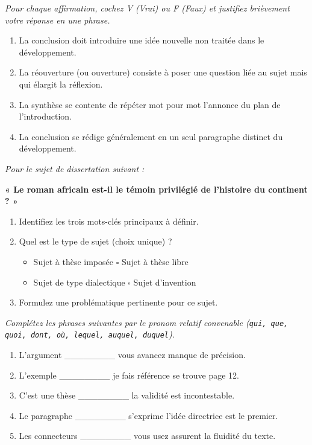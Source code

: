 \documentclass[11pt]{article}
\begin{document}
\begin{exercice}
\label{exo:conclusion_vf}
\emph{Pour chaque affirmation, cochez V (Vrai) ou F (Faux) et justifiez brièvement votre réponse en une phrase.}
\begin{enumerate}
    \item La conclusion doit introduire une idée nouvelle non traitée dans le développement.
    \item La réouverture (ou ouverture) consiste à poser une question liée au sujet mais qui élargit la réflexion.
    \item La synthèse se contente de répéter mot pour mot l'annonce du plan de l'introduction.
    \item La conclusion se rédige généralement en un seul paragraphe distinct du développement.
\end{enumerate}
\end{exercice}

\begin{exercice}
\label{exo:analyse_sujet}
\emph{Pour le sujet de dissertation suivant :}
\begin{center}
\textbf{« Le roman africain est-il le témoin privilégié de l'histoire du continent ? »}
\end{center}
\begin{enumerate}
    \item Identifiez les trois mots-clés principaux à définir.
    \item Quel est le type de sujet (choix unique) ?
    \begin{itemize}
        \item[$\square$] Sujet à thèse imposée \hfill $\square$ Sujet à thèse libre
        \item[$\square$] Sujet de type dialectique \hfill $\square$ Sujet d'invention
    \end{itemize}
    \item Formulez une problématique pertinente pour ce sujet.
\end{enumerate}
\end{exercice}

\begin{exercice}
\label{exo:pronoms}
\emph{Complétez les phrases suivantes par le pronom relatif convenable (\texttt{qui, que, quoi, dont, où, lequel, auquel, duquel}).}
\begin{enumerate}
    \item L'argument \_\_\_\_\_\_\_\_ vous avancez manque de précision.
    \item L'exemple \_\_\_\_\_\_\_\_ je fais référence se trouve page 12.
    \item C'est une thèse \_\_\_\_\_\_\_\_ la validité est incontestable.
    \item Le paragraphe \_\_\_\_\_\_\_\_ s'exprime l'idée directrice est le premier.
    \item Les connecteurs \_\_\_\_\_\_\_\_ vous usez assurent la fluidité du texte.
\end{enumerate}
\end{exercice}
\end{document}
